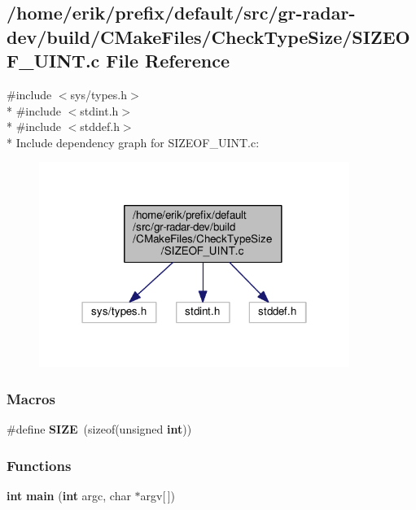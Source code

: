 \subsection{/home/erik/prefix/default/src/gr-\/radar-\/dev/build/\+C\+Make\+Files/\+Check\+Type\+Size/\+S\+I\+Z\+E\+O\+F\+\_\+\+U\+I\+NT.c File Reference}
\label{SIZEOF__UINT_8c}
{\ttfamily \#include $<$sys/types.\+h$>$}\\*
{\ttfamily \#include $<$stdint.\+h$>$}\\*
{\ttfamily \#include $<$stddef.\+h$>$}\\*
Include dependency graph for S\+I\+Z\+E\+O\+F\+\_\+\+U\+I\+N\+T.\+c\+:
\nopagebreak
\begin{figure}[H]
\begin{center}
\leavevmode
\includegraphics[width=286pt]{d8/d06/SIZEOF__UINT_8c__incl}
\end{center}
\end{figure}
\subsubsection*{Macros}
\begin{DoxyCompactItemize}
\item 
\#define {\bf S\+I\+ZE}~(sizeof(unsigned {\bf int}))
\end{DoxyCompactItemize}
\subsubsection*{Functions}
\begin{DoxyCompactItemize}
\item 
{\bf int} {\bf main} ({\bf int} argc, char $\ast$argv[$\,$])
\end{DoxyCompactItemize}
